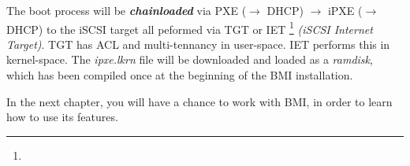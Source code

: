 \begin{enumerate}
The boot process will be \textbf{\emph{chainloaded}} via PXE ($\rightarrow$ DHCP) $\rightarrow$ iPXE ($\rightarrow$ DHCP) to the iSCSI target all peformed via TGT or IET \footnote{} \emph{(iSCSI Internet Target)}.  TGT has ACL and multi-tennancy in user-space.  IET performs this in kernel-space.  The \emph{ipxe.lkrn} file will be downloaded and loaded as a \emph{ramdisk}, which has been compiled once at the beginning of the BMI installation. \\ %

\end{enumerate}

In the next chapter, you will have a chance to work with BMI, in order to learn how to use its features.